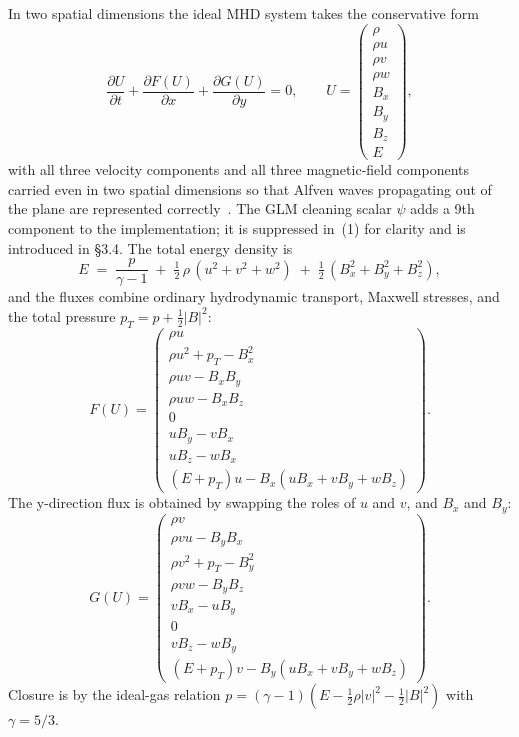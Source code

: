 \documentclass[11pt]{article}
\begin{document}
In two spatial dimensions the ideal MHD system takes the conservative form
\begin{equation}
\frac{\partial U}{\partial t}
  + \frac{\partial F(U)}{\partial x}
  + \frac{\partial G(U)}{\partial y} = 0,
\qquad
U = \begin{pmatrix} \rho \\ \rho u \\ \rho v \\ \rho w \\ B_x \\ B_y \\ B_z \\ E \end{pmatrix},
\end{equation}
with all three velocity components and all three magnetic-field components carried even in two spatial dimensions so that Alfven waves propagating out of the plane are represented correctly~\cite{powell1999}.  The GLM cleaning scalar $\psi$ adds a 9th component to the implementation; it is suppressed in~(1) for clarity and is introduced in \S3.4.  The total energy density is
\begin{equation}
E \;=\; \frac{p}{\gamma - 1}
       \;+\; \tfrac{1}{2}\,\rho\,(u^{2}+v^{2}+w^{2})
       \;+\; \tfrac{1}{2}\,(B_x^{2}+B_y^{2}+B_z^{2}),
\end{equation}
and the fluxes combine ordinary hydrodynamic transport, Maxwell stresses, and the total pressure $p_T = p + \tfrac{1}{2}|B|^{2}$:
\begin{equation}
F(U) = \begin{pmatrix}
\rho u \\
\rho u^{2} + p_T - B_x^{2} \\
\rho u v - B_x B_y \\
\rho u w - B_x B_z \\
0 \\
u B_y - v B_x \\
u B_z - w B_x \\
(E + p_T)u - B_x (u B_x + v B_y + w B_z)
\end{pmatrix}.
\end{equation}
The y-direction flux is obtained by swapping the roles of $u$ and $v$, and $B_x$ and $B_y$:
\begin{equation}
G(U) = \begin{pmatrix}
\rho v \\
\rho v u - B_y B_x \\
\rho v^{2} + p_T - B_y^{2} \\
\rho v w - B_y B_z \\
v B_x - u B_y \\
0 \\
v B_z - w B_y \\
(E + p_T)v - B_y (u B_x + v B_y + w B_z)
\end{pmatrix}.
\end{equation}
Closure is by the ideal-gas relation $p = (\gamma-1)(E - \tfrac{1}{2}\rho |v|^{2} - \tfrac{1}{2}|B|^{2})$ with $\gamma = 5/3$.
\end{document}
